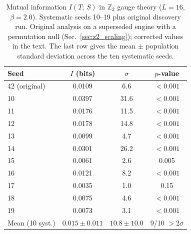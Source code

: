 \documentclass[aps,pra,twocolumn,superscriptaddress,showpacs,floatfix]{revtex4-2}
\newcommand{\Ztwo}{\mathbb{Z}_2}
\newcommand{\MI}{I(T;\,S)}
\begin{document}
\begin{table}[b]
\caption{Mutual information $\MI$ in $\Ztwo$ gauge theory ($L=16$, $\beta=2.0$).
Systematic seeds 10--19 plus original discovery run. Original analysis on a superseded engine with a permutation null (Sec.~\ref{sec:z2_scaling});
corrected values in the text. The last row gives the mean $\pm$ population
standard deviation across the ten systematic seeds.} \label{tab:seeds}
\begin{ruledtabular}
\begin{tabular}{lccc}
Seed & $I$ (bits) & $\sigma$ & $p$-value \\
\midrule
42 (original)   & 0.0109 &  6.6 & $<0.001$ \\
10              & 0.0397 & 31.6 & $<0.001$ \\
11              & 0.0176 & 11.5 & $<0.001$ \\
12              & 0.0178 & 14.8 & $<0.001$ \\
13              & 0.0099 &  4.7 & $<0.001$ \\
14              & 0.0301 & 26.2 & $<0.001$ \\
15              & 0.0061 &  2.6 & 0.005 \\
16              & 0.0121 &  8.2 & $<0.001$ \\
17              & 0.0035 &  1.0 & 0.15 \\
18              & 0.0075 &  4.6 & $<0.001$ \\
19              & 0.0073 &  3.1 & $<0.001$ \\
\midrule
Mean (10 syst.) & $0.015 \pm 0.011$ & $10.8 \pm 10.0$ & 9/10 ${>}2\sigma$ \\
\end{tabular}
\end{ruledtabular}
\end{table}
\end{document}

